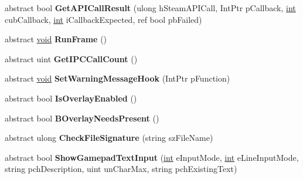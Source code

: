 \begin{DoxyCompactItemize}
\item 
\hypertarget{classValve_1_1Steamworks_1_1ISteamUtils_adac9f9942863d932a078e8b1171ba4b2}{}abstract bool {\bfseries Get\+A\+P\+I\+Call\+Result} (ulong h\+Steam\+A\+P\+I\+Call, Int\+Ptr p\+Callback, \hyperlink{SDL__thread_8h_a6a64f9be4433e4de6e2f2f548cf3c08e}{int} cub\+Callback, \hyperlink{SDL__thread_8h_a6a64f9be4433e4de6e2f2f548cf3c08e}{int} i\+Callback\+Expected, ref bool pb\+Failed)\label{classValve_1_1Steamworks_1_1ISteamUtils_adac9f9942863d932a078e8b1171ba4b2}

\item 
\hypertarget{classValve_1_1Steamworks_1_1ISteamUtils_a7de1b55c70579961e86990fe0c2b0f59}{}abstract \hyperlink{SDL__audio_8h_a52835ae37c4bb905b903cbaf5d04b05f}{void} {\bfseries Run\+Frame} ()\label{classValve_1_1Steamworks_1_1ISteamUtils_a7de1b55c70579961e86990fe0c2b0f59}

\item 
\hypertarget{classValve_1_1Steamworks_1_1ISteamUtils_a349cf5610843e0a7ee6c8e95029c71da}{}abstract uint {\bfseries Get\+I\+P\+C\+Call\+Count} ()\label{classValve_1_1Steamworks_1_1ISteamUtils_a349cf5610843e0a7ee6c8e95029c71da}

\item 
\hypertarget{classValve_1_1Steamworks_1_1ISteamUtils_a806b59bf0a7c1c7fa03d40dbb92005e1}{}abstract \hyperlink{SDL__audio_8h_a52835ae37c4bb905b903cbaf5d04b05f}{void} {\bfseries Set\+Warning\+Message\+Hook} (Int\+Ptr p\+Function)\label{classValve_1_1Steamworks_1_1ISteamUtils_a806b59bf0a7c1c7fa03d40dbb92005e1}

\item 
\hypertarget{classValve_1_1Steamworks_1_1ISteamUtils_a41af6bffd359cedd6dccef4d8c467c15}{}abstract bool {\bfseries Is\+Overlay\+Enabled} ()\label{classValve_1_1Steamworks_1_1ISteamUtils_a41af6bffd359cedd6dccef4d8c467c15}

\item 
\hypertarget{classValve_1_1Steamworks_1_1ISteamUtils_a83019ac83f93dc0502c7ab02dedd3122}{}abstract bool {\bfseries B\+Overlay\+Needs\+Present} ()\label{classValve_1_1Steamworks_1_1ISteamUtils_a83019ac83f93dc0502c7ab02dedd3122}

\item 
\hypertarget{classValve_1_1Steamworks_1_1ISteamUtils_a132632a683e621a20ddca58d4453481c}{}abstract ulong {\bfseries Check\+File\+Signature} (string sz\+File\+Name)\label{classValve_1_1Steamworks_1_1ISteamUtils_a132632a683e621a20ddca58d4453481c}

\item 
\hypertarget{classValve_1_1Steamworks_1_1ISteamUtils_af3c2b968e3b0add15685f6a059196c05}{}abstract bool {\bfseries Show\+Gamepad\+Text\+Input} (\hyperlink{SDL__thread_8h_a6a64f9be4433e4de6e2f2f548cf3c08e}{int} e\+Input\+Mode, \hyperlink{SDL__thread_8h_a6a64f9be4433e4de6e2f2f548cf3c08e}{int} e\+Line\+Input\+Mode, string pch\+Description, uint un\+Char\+Max, string pch\+Existing\+Text)\label{classValve_1_1Steamworks_1_1ISteamUtils_af3c2b968e3b0add15685f6a059196c05}


\end{DoxyCompactItemize}
